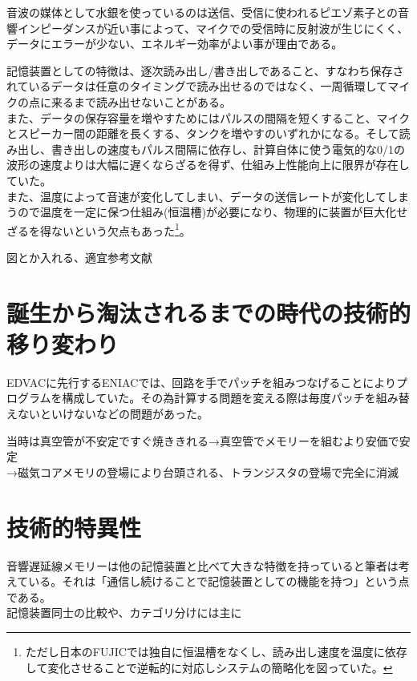 音波の媒体として水銀を使っているのは送信、受信に使われるピエゾ素子との音響インピーダンスが近い事によって、マイクでの受信時に反射波が生じにくく、データにエラーが少ない、エネルギー効率がよい事が理由である。

記憶装置としての特徴は、逐次読み出し/書き出しであること、すなわち保存されているデータは任意のタイミングで読み出せるのではなく、一周循環してマイクの点に来るまで読み出せないことがある。\\
また、データの保存容量を増やすためにはパルスの間隔を短くすること、マイクとスピーカー間の距離を長くする、タンクを増やすのいずれかになる。そして読み出し、書き出しの速度もパルス間隔に依存し、計算自体に使う電気的な0/1の波形の速度よりは大幅に遅くならざるを得ず、仕組み上性能向上に限界が存在していた。\\
また、温度によって音速が変化してしまい、データの送信レートが変化してしまうので温度を一定に保つ仕組み(恒温槽)が必要になり、物理的に装置が巨大化せざるを得ないという欠点もあった\footnote{ただし日本のFUJICでは独自に恒温槽をなくし、読み出し速度を温度に依存して変化させることで逆転的に対応しシステムの簡略化を図っていた。}。

図とか入れる、適宜参考文献

\section{誕生から淘汰されるまでの時代の技術的移り変わり}\label{ux8a95ux751fux304bux3089ux6dd8ux6c70ux3055ux308cux308bux307eux3067ux306eux6642ux4ee3ux306eux6280ux8853ux7684ux79fbux308aux5909ux308fux308a}

EDVACに先行するENIACでは、回路を手でパッチを組みつなげることによりプログラムを構成していた。その為計算する問題を変える際は毎度パッチを組み替えないといけないなどの問題があった。

当時は真空管が不安定ですぐ焼ききれる→真空管でメモリーを組むより安価で安定\\
→磁気コアメモリの登場により台頭される、トランジスタの登場で完全に消滅

\section{技術的特異性}\label{ux6280ux8853ux7684ux7279ux7570ux6027}

音響遅延線メモリーは他の記憶装置と比べて大きな特徴を持っていると筆者は考えている。それは「通信し続けることで記憶装置としての機能を持つ」という点である。\\
記憶装置同士の比較や、カテゴリ分けには主に

